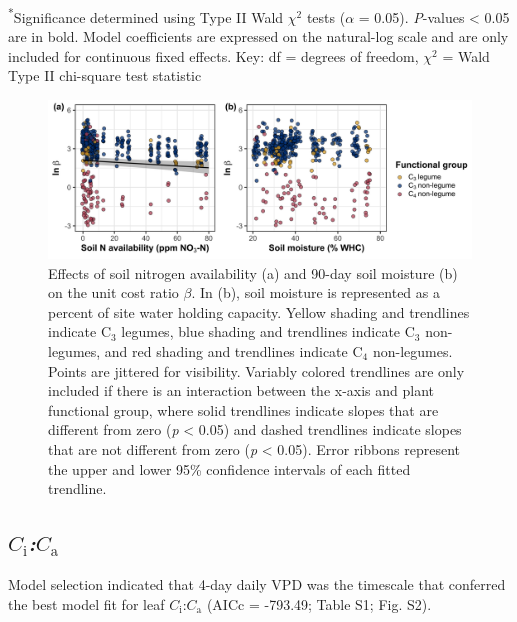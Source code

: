 \noindent \textsuperscript{*}Significance determined using Type II Wald $\chi^{2}$ tests ($\alpha$ = 0.05). \textit{P}-values < 0.05 are in bold. Model coefficients are expressed on the natural-log scale and are only included for continuous fixed effects. Key: df = degrees of freedom, $\chi^2$ = Wald Type II chi-square test statistic
\clearpage

\newpage
\begin{landscape}
    \begin{figure}
    \centering
    \includegraphics[scale = 0.075]{ch4_TXeco/figs/TXeco_fig2_beta.png}
    \caption[Effects of soil nitrogen availability and soil moisture on the unit cost ratio $\beta$]{Effects of soil nitrogen availability (a) and 90-day soil moisture (b) on the unit cost ratio $\beta$. In (b), soil moisture is represented as a percent of site water holding capacity. Yellow shading and trendlines indicate C$_3$ legumes, blue shading and trendlines indicate C$_3$ non-legumes, and red shading and trendlines indicate C$_4$ non-legumes. Points are jittered for visibility. Variably colored trendlines are only included if there is an interaction between the x-axis and plant functional group, where solid trendlines indicate slopes that are different from zero (\textit{p} < 0.05) and dashed trendlines indicate slopes that are not different from zero (\textit{p} < 0.05). Error ribbons represent the upper and lower 95\% confidence intervals of each fitted trendline.}
    \label{fig:figure4.2}
\end{figure}
\end{landscape}
\clearpage

\subsection{\textit{$C_\mathrm{i}$:$C_\mathrm{a}$}}
\noindent Model selection indicated that 4-day daily VPD was the timescale that conferred the best model fit for leaf $C_\mathrm{i}$:$C_\mathrm{a}$ (AICc = -793.49; Table S1; Fig. S2).

